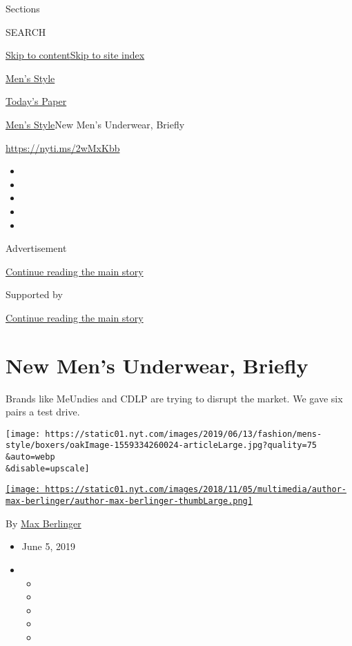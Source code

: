 Sections

SEARCH

\protect\hyperlink{site-content}{Skip to
content}\protect\hyperlink{site-index}{Skip to site index}

\href{https://www.nytimes.com/section/fashion/mens-style}{Men's Style}

\href{https://myaccount.nytimes.com/auth/login?response_type=cookie\&client_id=vi}{}

\href{https://www.nytimes.com/section/todayspaper}{Today's Paper}

\href{/section/fashion/mens-style}{Men's Style}\textbar{}New Men's
Underwear, Briefly

\href{https://nyti.ms/2wMxKbb}{https://nyti.ms/2wMxKbb}

\begin{itemize}
\item
\item
\item
\item
\item
\end{itemize}

Advertisement

\protect\hyperlink{after-top}{Continue reading the main story}

Supported by

\protect\hyperlink{after-sponsor}{Continue reading the main story}

\hypertarget{new-mens-underwear-briefly}{%
\section{New Men's Underwear,
Briefly}\label{new-mens-underwear-briefly}}

Brands like MeUndies and CDLP are trying to disrupt the market. We gave
six pairs a test drive.

\texttt{[image: https://static01.nyt.com/images/2019/06/13/fashion/mens-style/boxers/oakImage-1559334260024-articleLarge.jpg?quality=75\\\&auto=webp\\\&disable=upscale]}

\href{https://www.nytimes.com/by/max-berlinger}{\texttt{[image: https://static01.nyt.com/images/2018/11/05/multimedia/author-max-berlinger/author-max-berlinger-thumbLarge.png]}}

By \href{https://www.nytimes.com/by/max-berlinger}{Max Berlinger}

\begin{itemize}
\item
  June 5, 2019
\item
  \begin{itemize}
  \item
  \item
  \item
  \item
  \item
  \end{itemize}
\end{itemize}

